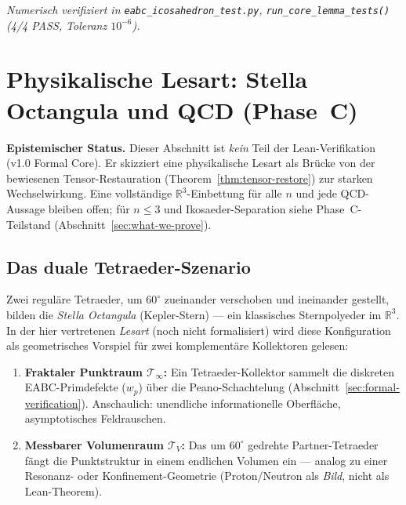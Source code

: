 \documentclass[11pt,a4paper]{article}
\begin{document}
	\smallskip\noindent
	\textit{Numerisch verifiziert in \texttt{eabc\_icosahedron\_test.py},
		\texttt{run\_core\_lemma\_tests()} (4/4 PASS, Toleranz $10^{-6}$).}
	
	\section{Physikalische Lesart: Stella Octangula und QCD (Phase~C)}
	\label{sec:phase-c-qcd}
	
	\textbf{Epistemischer Status.}
	Dieser Abschnitt ist \emph{kein} Teil der Lean-Verifikation (v1.0 Formal Core).
	Er skizziert eine physikalische Lesart als Brücke von der bewiesenen Tensor-Restauration
	(Theorem~\ref{thm:tensor-restore}) zur starken Wechselwirkung.
	Eine vollständige $\mathbb{R}^3$-Einbettung für alle $n$ und jede QCD-Aussage
	bleiben offen; für $n\le 3$ und Ikosaeder-Separation siehe Phase~C-Teilstand
	(Abschnitt~\ref{sec:what-we-prove}).
	
	\subsection{Das duale Tetraeder-Szenario}
	\label{sec:stella-octangula}
	
	Zwei reguläre Tetraeder, um $60^\circ$ zueinander verschoben und ineinander gestellt,
	bilden die \emph{Stella Octangula} (Kepler-Stern) --- ein klassisches Sternpolyeder
	im $\mathbb{R}^3$.
	In der hier vertretenen \emph{Lesart} (noch nicht formalisiert) wird diese Konfiguration
	als geometrisches Vorspiel für zwei komplementäre Kollektoren gelesen:
	
	\begin{enumerate}
		\item \textbf{Fraktaler Punktraum $\mathcal{T}_\infty$:}
		Ein Tetraeder-Kollektor sammelt die diskreten EABC-Primdefekte ($w_p$) über die
		Peano-Schachtelung (Abschnitt~\ref{sec:formal-verification}).
		Anschaulich: unendliche informationelle Oberfläche, asymptotisches Feldrauschen.
		\item \textbf{Messbarer Volumenraum $\mathcal{T}_V$:}
		Das um $60^\circ$ gedrehte Partner-Tetraeder fängt die Punktstruktur in einem
		endlichen Volumen ein --- analog zu einer Resonanz- oder Konfinement-Geometrie
		(Proton/Neutron als \emph{Bild}, nicht als Lean-Theorem).
	\end{enumerate}
	
\end{document}
